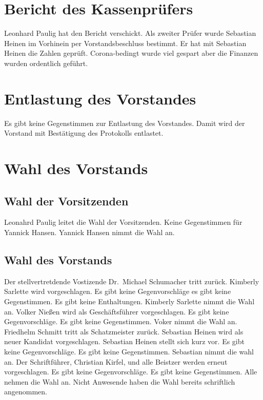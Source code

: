 \documentclass[a4paper, 11pt]{article}
\begin{document}
\section*{Bericht des Kassenprüfers}

Leonhard Paulig hat den Bericht verschickt.
Als zweiter Prüfer wurde Sebastian Heinen im Vorhinein per Vorstandsbeschluss bestimmt.
Er hat mit Sebastian Heinen die Zahlen geprüft.
Corona-bedingt wurde viel gespart aber die Finanzen wurden ordentlich geführt.



\section*{Entlastung des Vorstandes}

Es gibt keine Gegenstimmen zur Entlastung des Vorstandes. Damit wird der Vorstand mit Bestätigung des Protokolls entlastet.

\section*{Wahl des Vorstands}

\subsection*{Wahl der Vorsitzenden}

Leonahrd Paulig leitet die Wahl der Vorsitzenden.
Keine Gegenstimmen für Yannick Hansen.
Yannick Hansen nimmt die Wahl an.

\subsection*{Wahl des Vorstands}

Der stellvertretdende Vostizende Dr.~Michael Schumacher tritt zurück.
Kimberly Sarlette wird vorgeschlagen.
Es gibt keine Gegenvorschläge
es gibt keine Gegenstimmen.
Es gibt keine Enthaltungen.
Kimberly Sarlette nimmt die Wahl an.
Volker Nießen wird als Geschäftsführer vorgeschlagen.
Es gibt keine Gegenvorschläge.
Es gibt keine Gegenstimmen.
Voker nimmt die Wahl an.
Friedhelm Schmitt tritt als Schatzmeister zurück.
Sebastian Heinen wird als neuer Kandidat vorgeschlagen.
Sebastian Heinen stellt sich kurz vor.
Es gibt keine Gegenvorschläge.
Es gibt keine Gegenstimmen.
Sebastian nimmt die wahl an.
Der Schriftführer, Christian Kirfel, und alle Beistzer werden erneut vorgeschlagen.
Es gibt keine Gegenvorschläge.
Es gibt keine Gegenstimmen.
Alle nehmen die Wahl an.
Nicht Anwesende haben die Wahl bereits schriftlich angenommen.
\end{document}
